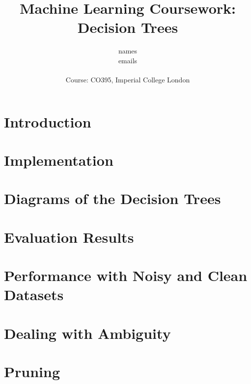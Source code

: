 \documentclass[a4paper,11pt]{article}
\title{Machine Learning Coursework: Decision Trees}
\author{names\\
       emails\\ \\
       \small{Course: CO395, Imperial College London}
}
\begin{document}
\maketitle

\section{Introduction}

\section{Implementation}

\section{Diagrams of the Decision Trees}

\section{Evaluation Results}

\section{Performance with Noisy and Clean Datasets}

\section{Dealing with Ambiguity}

\section{Pruning}
\end{document}
